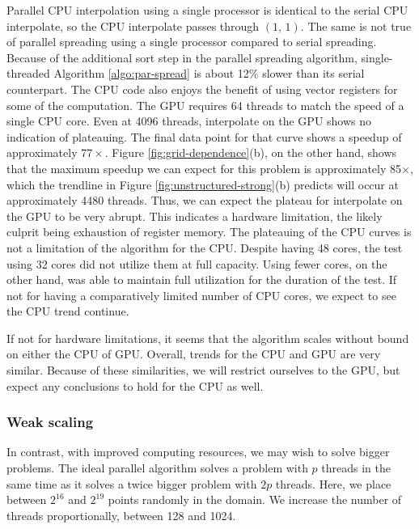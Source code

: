 Parallel CPU interpolation using a single processor is identical to the serial
CPU interpolate, so the CPU interpolate passes through $(1,\,1)$. The same is
not true of parallel spreading using a single processor compared to serial
spreading. Because of the additional sort step in the parallel spreading
algorithm, single-threaded Algorithm \ref{algo:par-spread} is about 12\% slower
than its serial counterpart. The CPU code also enjoys the benefit of using
vector registers for some of the computation. The GPU requires 64 threads to
match the speed of a single CPU core.
%
Even at 4096 threads, interpolate on the GPU shows no indication of plateauing. The final
data point for that curve shows a speedup of approximately $77\times$. Figure
\ref{fig:grid-dependence}(b), on the other hand, shows that the maximum speedup we can
expect for this problem is approximately 85$\times$, which the trendline in Figure
\ref{fig:unstructured-strong}(b) predicts will occur at approximately 4480 threads. Thus,
we can expect the plateau for interpolate on the GPU to be very abrupt. This indicates a
hardware limitation, the likely culprit being exhaustion of register memory. The
plateauing of the CPU curves is not a limitation of the algorithm for the CPU. Despite
having 48 cores, the test using 32 cores did not utilize them at full capacity. Using
fewer cores, on the other hand, was able to maintain full utilization for the duration of
the test. If not for having a comparatively limited number of CPU cores, we expect to see
the CPU trend continue.

If not for hardware limitations, it seems that the algorithm scales without bound on
either the CPU of GPU. Overall, trends for the CPU and GPU are very similar. Because of
these similarities, we will restrict ourselves to the GPU, but expect any conclusions to
hold for the CPU as well.

\subsubsection{Weak scaling}\label{sec:unst-weak}
In contrast, with improved computing resources, we may wish to solve bigger problems. The
ideal parallel algorithm solves a problem with $p$ threads in the same time as it solves
a twice bigger problem with $2p$ threads. Here, we place between $2^{16}$ and $2^{19}$
points randomly in the domain. We increase the number of threads proportionally, between
128 and 1024.  

